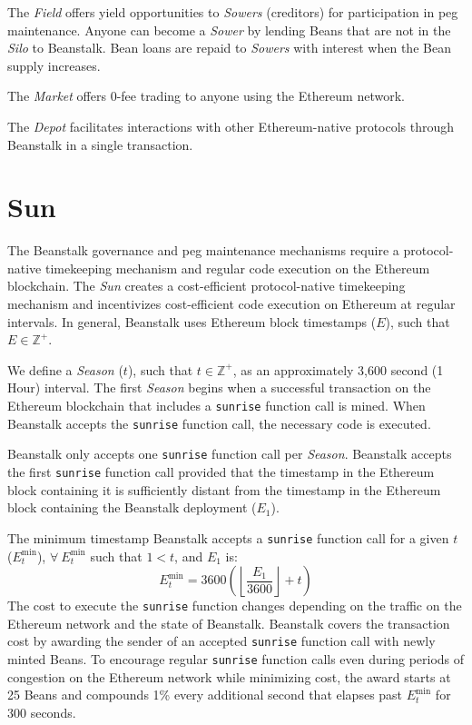\documentclass[tikz]{article}
\newcommand{\code}[1]{\texttt{#1}}
\newcommand{\term}[1]{\textsl{#1}}
\begin{document}
The \term{Field} offers yield opportunities to \term{Sowers} (creditors) for participation in peg maintenance. Anyone can become a \term{Sower} by lending Beans that are not in the \term{Silo} to Beanstalk. Bean loans are repaid to \term{Sowers} with interest when the Bean supply increases. 

The \term{Market} offers 0-fee trading to anyone using the Ethereum network.

The \term{Depot} facilitates interactions with other Ethereum-native protocols through Beanstalk in a single transaction.

\section{Sun}
The Beanstalk governance and peg maintenance mechanisms require a protocol-native timekeeping mechanism and regular code execution on the Ethereum blockchain. The \term{Sun} creates a cost-efficient protocol-native timekeeping mechanism and incentivizes cost-efficient code execution on Ethereum at regular intervals. In general, Beanstalk uses Ethereum block timestamps ($E$), such that $E \in \mathbb{Z}^{+}$.

We define a \term{Season} ($t$), such that $t \in \mathbb{Z}^{+}$, as an approximately 3,600 second (1 Hour) interval. The first \term{Season} begins when a successful transaction on the Ethereum blockchain that includes a \code{sunrise} function call is mined. When Beanstalk accepts the \code{sunrise} function call, the necessary code is executed.

Beanstalk only accepts one \code{sunrise} function call per \term{Season}. Beanstalk accepts the first \code{sunrise} function call provided that the timestamp in the Ethereum block containing it is sufficiently distant from the timestamp in the Ethereum block containing the Beanstalk deployment ($E_1$).

The minimum timestamp Beanstalk accepts a \code{sunrise} function call for a given $t$ ($E_{t}^{\text{min}}$), $\forall\ E_{t}^{\text{min}}$ such that $1 < t$, and $E_1$ is:
$$E_{t}^{\text{min}} = 3600{\left({\left\lfloor\frac{E_1}{3600}\right\rfloor} + t\right)}$$
The cost to execute the \code{sunrise} function changes depending on the traffic on the Ethereum network and the state of Beanstalk. Beanstalk covers the transaction cost by awarding the sender of an accepted \code{sunrise} function call with newly minted Beans. To encourage regular \code{sunrise} function calls even during periods of congestion on the Ethereum network while minimizing cost, the award starts at 25 Beans and compounds 1\% every additional second that elapses past $E_{t}^{\text{min}}$ for 300 seconds.
\end{document}
